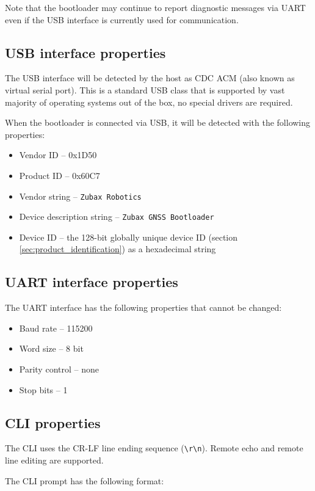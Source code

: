 \documentclass{zubaxdoc}
\begin{document}
Note that the bootloader may continue to report diagnostic messages via UART even
if the USB interface is currently used for communication.

\subsection{USB interface properties}

The USB interface will be detected by the host as CDC ACM (also known as virtual serial port).
This is a standard USB class that is supported by vast majority of operating systems out of the box,
no special drivers are required.

When the bootloader is connected via USB, it will be detected with the following properties:
\begin{itemize}
    \item Vendor ID -- 0x1D50
    \item Product ID -- 0x60C7
    \item Vendor string -- \verb|Zubax Robotics|
    \item Device description string -- \verb|Zubax GNSS Bootloader|
    \item Device ID -- the 128-bit globally unique device ID (section \ref{sec:product_identification})
                       as a hexadecimal string
\end{itemize}

\subsection{UART interface properties}

The UART interface has the following properties that cannot be changed:
\begin{itemize}
    \item Baud rate -- 115200
    \item Word size -- 8 bit
    \item Parity control -- none
    \item Stop bits -- 1
\end{itemize}

\subsection{CLI properties}

The CLI uses the CR-LF line ending sequence (\verb|\r\n|).
Remote echo and remote line editing are supported.

The CLI prompt has the following format:
\end{document}
